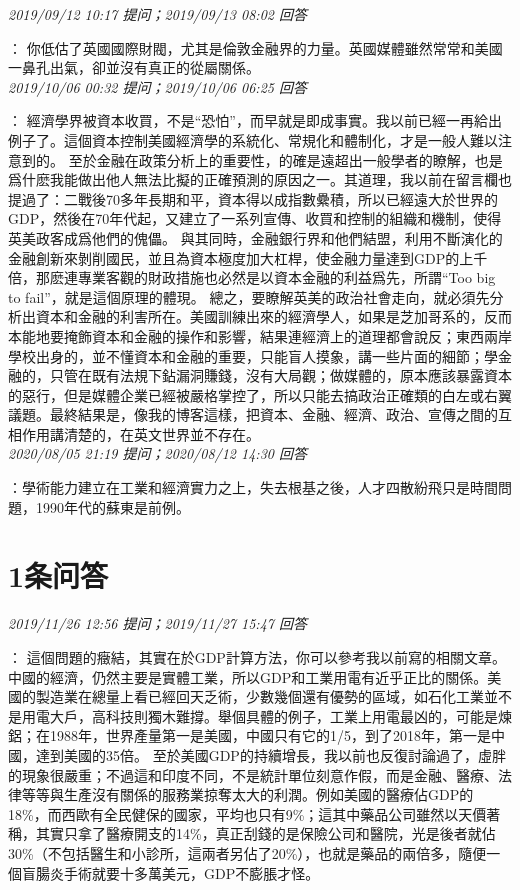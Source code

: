 \documentclass[twocolumn]{ctexart}
\begin{document}
\textit{\hfill\noindent\small 2019/09/12 10:17 提问；2019/09/13 08:02 回答}

：
你低估了英國國際財閥，尤其是倫敦金融界的力量。英國媒體雖然常常和美國一鼻孔出氣，卻並沒有真正的從屬關係。
\\

\textit{\hfill\noindent\small 2019/10/06 00:32 提问；2019/10/06 06:25 回答}

：
經濟學界被資本收買，不是“恐怕”，而早就是即成事實。我以前已經一再給出例子了。這個資本控制美國經濟學的系統化、常規化和體制化，才是一般人難以注意到的。 
至於金融在政策分析上的重要性，的確是遠超出一般學者的瞭解，也是爲什麽我能做出他人無法比擬的正確預測的原因之一。其道理，我以前在留言欄也提過了：二戰後70多年長期和平，資本得以成指數纍積，所以已經遠大於世界的GDP，然後在70年代起，又建立了一系列宣傳、收買和控制的組織和機制，使得英美政客成爲他們的傀儡。 
與其同時，金融銀行界和他們結盟，利用不斷演化的金融創新來剝削國民，並且為資本極度加大杠桿，使金融力量達到GDP的上千倍，那麽連專業客觀的財政措施也必然是以資本金融的利益爲先，所謂“Too big to fail”，就是這個原理的體現。 
總之，要瞭解英美的政治社會走向，就必須先分析出資本和金融的利害所在。美國訓練出來的經濟學人，如果是芝加哥系的，反而本能地要掩飾資本和金融的操作和影響，結果連經濟上的道理都會說反；東西兩岸學校出身的，並不懂資本和金融的重要，只能盲人摸象，講一些片面的細節；學金融的，只管在既有法規下鉆漏洞賺錢，沒有大局觀；做媒體的，原本應該暴露資本的惡行，但是媒體企業已經被嚴格掌控了，所以只能去搞政治正確類的白左或右翼議題。最終結果是，像我的博客這樣，把資本、金融、經濟、政治、宣傳之間的互相作用講清楚的，在英文世界並不存在。
\\

\textit{\hfill\noindent\small 2020/08/05 21:19 提问；2020/08/12 14:30 回答}

：學術能力建立在工業和經濟實力之上，失去根基之後，人才四散紛飛只是時間問題，1990年代的蘇東是前例。
\\

\section{1条问答}

\textit{\hfill\noindent\small 2019/11/26 12:56 提问；2019/11/27 15:47 回答}

：
這個問題的癥結，其實在於GDP計算方法，你可以參考我以前寫的相關文章。 
中國的經濟，仍然主要是實體工業，所以GDP和工業用電有近乎正比的關係。美國的製造業在總量上看已經回天乏術，少數幾個還有優勢的區域，如石化工業並不是用電大戶，高科技則獨木難撐。舉個具體的例子，工業上用電最凶的，可能是煉鋁；在1988年，世界產量第一是美國，中國只有它的1/5，到了2018年，第一是中國，達到美國的35倍。 
至於美國GDP的持續增長，我以前也反復討論過了，虛胖的現象很嚴重；不過這和印度不同，不是統計單位刻意作假，而是金融、醫療、法律等等與生產沒有關係的服務業掠奪太大的利潤。例如美國的醫療佔GDP的18\%，而西歐有全民健保的國家，平均也只有9\%；這其中藥品公司雖然以天價著稱，其實只拿了醫療開支的14\%，真正刮錢的是保險公司和醫院，光是後者就佔30\%（不包括醫生和小診所，這兩者另佔了20\%），也就是藥品的兩倍多，隨便一個盲腸炎手術就要十多萬美元，GDP不膨脹才怪。
\\
\end{document}
